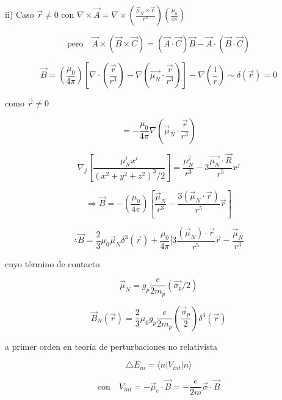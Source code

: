 \documentclass{report}
\begin{document}
ii) Caso $\overrightarrow{r} \neq 0$ con $\nabla \times \overrightarrow{A} = \nabla \times (\frac{\overrightarrow{\mu} _{N} \times \overrightarrow{r}}{r^3 }) (\frac{\mu_0 }{4 \pi })$

\[\text{pero} \quad \overrightarrow{A} \times (\overrightarrow{B} \times \overrightarrow{C}) = (\overrightarrow{A} \cdot \overrightarrow{C})\overrightarrow{B} - \overrightarrow{A} \cdot (\overrightarrow{B} \cdot \overrightarrow{C})\]

\[\overrightarrow{B} = ( \frac{\mu_0 }{4 \pi}) [\nabla \cdot (\frac{\overrightarrow{r}}{r^3 }) - \nabla (\overrightarrow{\mu _{N}} \cdot \frac{\overrightarrow{r}}{r^3 })] - \nabla (\frac{1}{r}) \sim \delta (\overrightarrow{r}) = 0\]

como $\overrightarrow{r} \neq 0$

\[= -\frac{\mu_0 }{4 \pi} \nabla (\overrightarrow{\mu} _{N} \cdot \frac{\overrightarrow{r}}{r^3 })\]

\[\nabla _j [\frac{\mu _{N}^{i} x^ i}{(x^2 + y^2 + z^2 )^3/2 }] = \frac{\mu_{N}^{j}}{r^3 } - 3 \frac{\overrightarrow{\mu _{N}} \cdot \overrightarrow{R}}{r^5 } x^j \]

\[\Rightarrow \overrightarrow{B} = - (\frac{\mu _0 }{4 \pi }) [\frac{\overrightarrow{\mu} _{N}}{r^3 } - \frac{3 (\overrightarrow{\mu} _{N} \cdot \overrightarrow{r})}{r^5 } \overrightarrow{r}] \]

\begin{equation}
\therefore \overrightarrow{B} = \frac{2}{3} \mu _{0} \overrightarrow{\mu}_{N} \delta ^3 (\overrightarrow{r}) + \frac{\mu _0}{4 \pi } [3 \frac{(\overrightarrow{\mu} _{N}) \cdot \overrightarrow{r}}{r^5} \overrightarrow{r} - \frac{\overrightarrow{\mu} _{N}}{r^3 }
\end{equation}

cuyo término de contacto 

\begin{equation}
\overrightarrow{\mu} _{N} = g_p \frac{e}{2m_p } (\overrightarrow{\sigma _p}/2)
\end{equation}

\[\overrightarrow{B} _{N} (\overrightarrow{r}) = \frac{2}{3} \mu _0 g _p \frac{e}{2m_p } (\frac{\overrightarrow{\sigma}_{p}}{2}) \delta ^3 (\overrightarrow{r}) \]

a primer orden en teoría de perturbaciones no relativista

\[\bigtriangleup E_m = \langle n | V_{int} | n \rangle \]

\[\text{con} \quad V_{int} = - \overrightarrow{\mu}_e \cdot \overrightarrow{B} = - \frac{e}{2m} \overrightarrow{\sigma} \cdot \overrightarrow{B} \]
\end{document}
